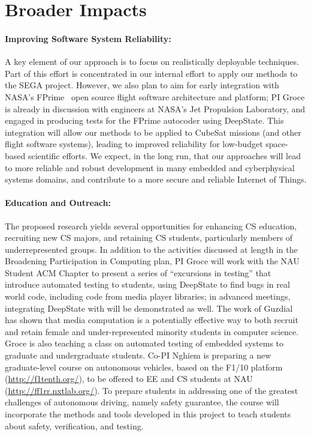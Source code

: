 \section{Broader Impacts}

\paragraph{Improving Software System Reliability:} A key element of
our approach is to focus on realistically deployable techniques.  Part
of this effort is concentrated in our internal effort to apply our
methods to the SEGA project.  However, we also plan
to aim for early integration with NASA's FPrime~\cite{fprime,fprimerepo}
open source
flight software architecture and platform; PI Groce is already in
discussion with engineers at NASA's Jet Propulsion Laboratory, and
engaged in producing tests for the FPrime autocoder using DeepState.
This integration will allow our
methods to be applied to CubeSat missions (and other flight software
systems), leading to improved reliability for low-budget space-based
scientific efforts.  We expect, in the long run, that our approaches
will lead to more reliable and robust development in many embedded and
cyberphysical systems domains, and contribute to a more secure and
reliable Internet of Things.  

\paragraph{Education and Outreach:}
The proposed research yields several opportunities for enhancing CS
education, recruiting new CS majors, and retaining CS students,
particularly members of underrepresented groups.  In addition to the
activities discussed at length in the Broadening Participation in Computing plan,
PI Groce will work with the NAU Student ACM Chapter to present a
series of ``excursions in testing'' that introduce automated testing
to students, using DeepState to find bugs in real world code, including code from
media player libraries; in advanced meetings, integrating DeepState
with \framac will be demonstrated as well.  The work of Guzdial
\cite{Guzdial} has shown that media computation is a
potentially effective way to both recruit and retain female and
under-represented minority students in computer science. Groce is also teaching a
class on automated testing of embedded systems to graduate and
undergraduate students.
Co-PI Nghiem is preparing a new graduate-level course on autonomous
vehicles, based on the F1/10 platform (\url{http://f1tenth.org/}), to be offered to EE and CS students at NAU (\url{http://ff1rr.nxtlab.org/}).
To prepare students in addressing one of the greatest challenges of autonomous driving, namely safety guarantee, the course will incorporate the methods and tools developed in this project to teach students about safety, verification, and testing.

